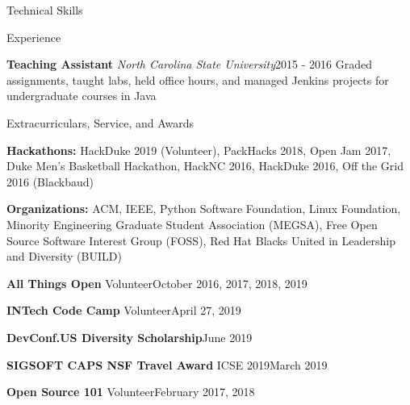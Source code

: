 \documentclass{resume} %
\begin{document}
\begin{rSection}{Technical Skills}
\begin{rSection}{Experience}
\begin{eSubsection}{\small \textbf{Teaching Assistant} \textit{North Carolina State University}}{\small 2015 - 2016}
{\small Graded assignments, taught labs, held office hours, and managed Jenkins projects for undergraduate courses in Java}
\end{eSubsection}
\vspace{-10pt}
\end{rSection}
\begin{rSection}{Extracurriculars, Service, and Awards}
\vspace{-5pt}
\begin{spacing}{0.25}
{\small \textbf{Hackathons:} HackDuke 2019 (Volunteer), PackHacks 2018, Open Jam 2017, Duke Men's Basketball Hackathon, HackNC 2016, HackDuke 2016, Off the Grid 2016 (Blackbaud)}
\end{spacing}
\vspace{5pt}
\begin{spacing}{0.25}
{\small \textbf{Organizations:} ACM, IEEE, Python Software Foundation, Linux Foundation, Minority Engineering Graduate Student Association (MEGSA), Free Open Source Software Interest Group (FOSS), Red Hat Blacks United in Leadership and Diversity (BUILD)}
\end{spacing}
\vspace{5pt}
\begin{sSubsection}
{\small \textbf{All Things Open} Volunteer}{October 2016, 2017, 2018, 2019} 
\end{sSubsection}
\vspace{-8pt}
\begin{sSubsection}
{\small \textbf{INTech Code Camp} Volunteer}{April 27, 2019} 
\end{sSubsection}
\vspace{-8pt}
\begin{sSubsection}
{\small \textbf{DevConf.US Diversity Scholarship}}{June 2019} 
\end{sSubsection}
\vspace{-8pt}
\begin{sSubsection}
{\small \textbf{SIGSOFT CAPS NSF Travel Award} ICSE 2019}{March 2019} 
\end{sSubsection}
\vspace{-8pt}
\begin{sSubsection}
{\small \textbf{Open Source 101} Volunteer}{February 2017, 2018} 
\end{sSubsection}




\end{rSection}
\end{rSection}
\end{document}
